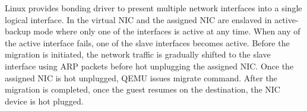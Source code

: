 
Linux provides bonding driver to present multiple network
interfaces into a single logical interface. In \na the virtual
NIC and the assigned NIC are enslaved in active-backup mode
where only one of the interfaces is active at any time. When
any of the active interface fails, one of the slave interfaces
becomes active. Before the migration is initiated, the network
traffic is gradually shifted to the slave interface using ARP
packets before hot unplugging the assigned NIC. Once the
assigned NIC is hot unplugged, QEMU issues migrate command.
After the migration is completed, once the guest resumes on
the destination, the NIC device is hot plugged.

